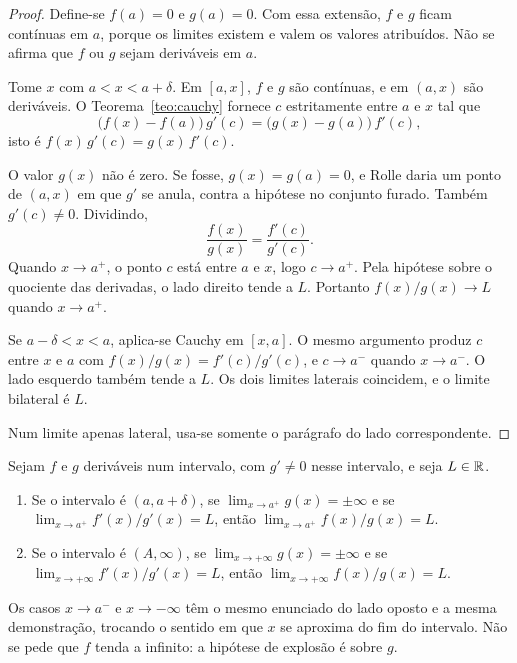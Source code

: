 \documentclass[11pt,a4paper]{article}
\begin{document}
\begin{proof}
Define-se $f(a)=0$ e $g(a)=0$. Com essa extensão, $f$ e $g$ ficam contínuas em $a$, porque os limites existem e valem os valores atribuídos. Não se afirma que $f$ ou $g$ sejam deriváveis em $a$.

Tome $x$ com $a<x<a+\delta$. Em $[a,x]$, $f$ e $g$ são contínuas, e em $(a,x)$ são deriváveis. O Teorema~\ref{teo:cauchy} fornece $c$ estritamente entre $a$ e $x$ tal que
\[
\bigl(f(x)-f(a)\bigr)\,g'(c)=\bigl(g(x)-g(a)\bigr)\,f'(c),
\]
isto é $f(x)\,g'(c)=g(x)\,f'(c)$.

O valor $g(x)$ não é zero. Se fosse, $g(x)=g(a)=0$, e Rolle daria um ponto de $(a,x)$ em que $g'$ se anula, contra a hipótese no conjunto furado. Também $g'(c)\neq 0$. Dividindo,
\[
\frac{f(x)}{g(x)}=\frac{f'(c)}{g'(c)}.
\]
Quando $x\to a^+$, o ponto $c$ está entre $a$ e $x$, logo $c\to a^+$. Pela hipótese sobre o quociente das derivadas, o lado direito tende a $L$. Portanto $f(x)/g(x)\to L$ quando $x\to a^+$.

Se $a-\delta<x<a$, aplica-se Cauchy em $[x,a]$. O mesmo argumento produz $c$ entre $x$ e $a$ com $f(x)/g(x)=f'(c)/g'(c)$, e $c\to a^-$ quando $x\to a^-$. O lado esquerdo também tende a $L$. Os dois limites laterais coincidem, e o limite bilateral é $L$.

Num limite apenas lateral, usa-se somente o parágrafo do lado correspondente.
\end{proof}

\begin{teorema}\label{teo:lhopital-inf}
Sejam $f$ e $g$ deriváveis num intervalo, com $g'\neq 0$ nesse intervalo, e seja $L\in\mathbb{R}$.
\begin{enumerate}
\item Se o intervalo é $(a,a+\delta)$, se $\lim_{x\to a^+}g(x)=\pm\infty$ e se $\lim_{x\to a^+}f'(x)/g'(x)=L$, então $\lim_{x\to a^+}f(x)/g(x)=L$.
\item Se o intervalo é $(A,\infty)$, se $\lim_{x\to+\infty}g(x)=\pm\infty$ e se $\lim_{x\to+\infty}f'(x)/g'(x)=L$, então $\lim_{x\to+\infty}f(x)/g(x)=L$.
\end{enumerate}
Os casos $x\to a^-$ e $x\to-\infty$ têm o mesmo enunciado do lado oposto e a mesma demonstração, trocando o sentido em que $x$ se aproxima do fim do intervalo. Não se pede que $f$ tenda a infinito: a hipótese de explosão é sobre $g$.
\end{teorema}
\end{document}
